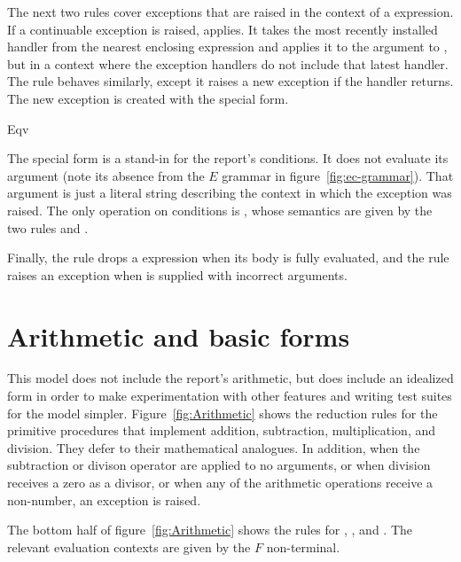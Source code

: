 The next two rules cover exceptions that are raised in the context of
a  expression. If a continuable exception is raised,
 applies. It takes the most recently installed
handler from the nearest enclosing  expression and
applies it to the argument to , but in a
context where the exception handlers do not include that latest
handler. The  rule behaves similarly, except it
raises a new exception if the handler returns. The new exception is
created with the  special form.

\beginfig
\begin{center}

\end{center}
\caption{Eqv}\label{fig:Eqv}
\endfig

The  special form is a stand-in for the report's
conditions. It does not evaluate its argument (note its absence from
the $E$ grammar in figure~\ref{fig:ec-grammar}). That argument
is just a literal string describing the context in which the exception
was raised. The only operation on conditions is ,
whose semantics are given by the two rules  and
.

Finally, the rule  drops a  expression
when its body is fully evaluated, and the rule 
raises an exception when  is supplied with
incorrect arguments.

\section{Arithmetic and basic forms}

This model does not include the report's arithmetic, but does include
an idealized form in order to make experimentation with other features
and writing test suites for the model simpler.
Figure~\ref{fig:Arithmetic} shows the reduction rules for the
primitive procedures that implement addition, subtraction,
multiplication, and division. They defer to their mathematical
analogues. In addition, when the subtraction or divison operator are
applied to no arguments, or when division receives a zero as a
divisor, or when any of the arithmetic operations receive a
non-number, an exception is raised.

The bottom half of figure~\ref{fig:Arithmetic} shows the rules for
, , and . The relevant
evaluation contexts are given by the $F$ non-terminal.

